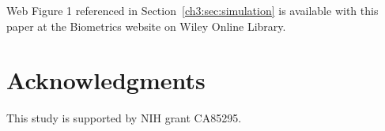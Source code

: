 \documentclass[useAMS,usenatbib,referee]{biom}
\begin{document}
Web Figure 1 referenced in Section~\ref{ch3:sec:simulation} is available
with this paper at the Biometrics website on Wiley Online Library.
\vspace*{-8pt}



\section*{Acknowledgments}

This study is supported by NIH grant CA85295.








\label{lastpage}
\end{document}

